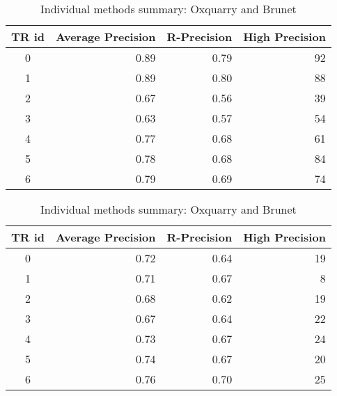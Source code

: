 \begin{table}[H]
  \centering
  \caption{Individual methods summary: Oxquarry and Brunet}
  \label{tab:rls_oxquarry_brunet}

  \begin{tabular}{c r r r}
    \toprule
    TR id &
    Average Precision &
    R-Precision &
    High Precision \\
    \midrule
    0 & 0.89 & 0.79 & 92 \\
    1 & 0.89 & 0.80 & 88 \\
    2 & 0.67 & 0.56 & 39 \\
    3 & 0.63 & 0.57 & 54 \\
    4 & 0.77 & 0.68 & 61 \\
    5 & 0.78 & 0.68 & 84 \\
    6 & 0.79 & 0.69 & 74 \\
    \bottomrule
  \end{tabular}

  \vspace{0.5cm}

  \begin{tabular}{c r r r}
    \toprule
    TR id &
    Average Precision &
    R-Precision &
    High Precision \\
    \midrule
    0 & 0.72 & 0.64 & 19 \\
    1 & 0.71 & 0.67 &  8 \\
    2 & 0.68 & 0.62 & 19 \\
    3 & 0.67 & 0.64 & 22 \\
    4 & 0.73 & 0.67 & 24 \\
    5 & 0.74 & 0.67 & 20 \\
    6 & 0.76 & 0.70 & 25 \\
    \bottomrule
  \end{tabular}
\end{table}



